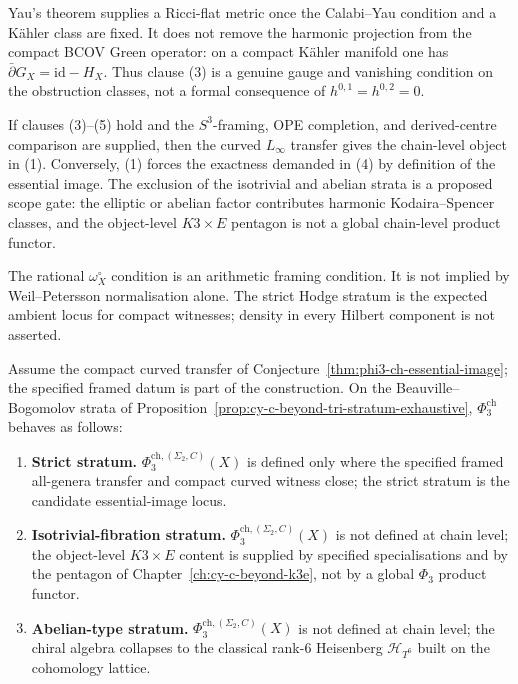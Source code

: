 \begin{remark}
Yau's theorem supplies a Ricci-flat metric once the Calabi--Yau
condition and a K\"ahler class are fixed. It does not remove the
harmonic projection from the compact BCOV Green operator: on a compact
K\"ahler manifold one has $\bar\partial G_X=\mathrm{id}-H_X$. Thus
clause \textup{(3)} is a genuine gauge and vanishing condition on the
obstruction classes, not a formal consequence of
$h^{0,1}=h^{0,2}=0$.

If clauses \textup{(3)--(5)} hold and the $S^3$-framing, OPE
completion, and derived-centre comparison are supplied, then the curved
$L_\infty$ transfer gives the chain-level object in
\textup{(1)}. Conversely, \textup{(1)} forces the exactness demanded in
\textup{(4)} by definition of the essential image. The exclusion of the
isotrivial and abelian strata is a proposed scope gate: the elliptic or
abelian factor contributes harmonic Kodaira--Spencer classes, and the
object-level $K3\times E$ pentagon is not a global chain-level product
functor.

The rational $\omega_X^\circ$ condition is an arithmetic framing
condition. It is not implied by Weil--Petersson normalisation alone.
The strict Hodge stratum is the expected ambient locus for compact
witnesses; density in every Hilbert component is not asserted.
\end{remark}

\begin{corollary}
\label{cor:essential-image-strata}
Assume the compact curved transfer of
Conjecture~\ref{thm:phi3-ch-essential-image}; the specified framed datum
is part of the construction.
On the Beauville--Bogomolov strata of Proposition~\ref{prop:cy-c-beyond-tri-stratum-exhaustive}, $\Phi_3^{\mathrm{ch}}$ behaves as follows:
\begin{enumerate}[label=\textup{(\roman*)}]
\item \textbf{Strict stratum.} $\Phi_3^{\mathrm{ch},(\Sigma_2,C)}(X)$ is defined only where the specified framed all-genera transfer and compact curved witness close; the strict stratum is the candidate essential-image locus.
\item \textbf{Isotrivial-fibration stratum.} $\Phi_3^{\mathrm{ch},(\Sigma_2,C)}(X)$ is not defined at chain level; the object-level $K3\times E$ content is supplied by specified specialisations and by the pentagon of Chapter~\ref{ch:cy-c-beyond-k3e}, not by a global $\Phi_3$ product functor.
\item \textbf{Abelian-type stratum.} $\Phi_3^{\mathrm{ch},(\Sigma_2,C)}(X)$ is not defined at chain level; the chiral algebra collapses to the classical rank-$6$ Heisenberg $\mathcal{H}_{T^6}$ built on the cohomology lattice.
\end{enumerate}
\end{corollary}

